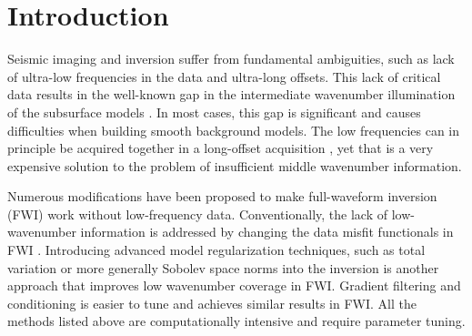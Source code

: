 \documentclass[paper,twocolomn]{geophysics}
\begin{document}
	






\section{Introduction}
Seismic imaging and inversion suffer from fundamental ambiguities, such as lack of ultra-low frequencies in the data and ultra-long offsets. This lack of critical data results in the well-known gap in the intermediate wavenumber illumination of the subsurface models \citep{claerbout1985, mora1989, sirgue2004, alkhalifahFullmodelWavenumberInversion2016, kazei2016, kazei2018, yao2019extraction}. In most cases, this gap is significant and causes difficulties when building smooth background models. The low frequencies can in principle be acquired together in a long-offset acquisition \citep[e.g.][]{fons2013}, yet that is a very expensive solution to the problem of insufficient middle wavenumber information.


Numerous modifications have been proposed to make full-waveform inversion (FWI) work without low-frequency data. %
Conventionally, the lack of low-wavenumber information is addressed by changing the data misfit functionals in FWI \citep[e.g.][]{luo1991wave, bozdag2011, choi2012, leeuwen2013, sun2019robust}.
Introducing advanced model regularization techniques, such as total variation or more generally Sobolev space norms \citep[e.g.][]{esserTotalvariationRegularizationStrategies2016, kazeiSaltbodyInversionMinimum2017, kalita2019regularized, skopintseva2019regularization} into the inversion is another approach that improves low wavenumber coverage in FWI.
Gradient filtering and conditioning \citep{ravaut2004multiscale, alkhalifahFullmodelWavenumberInversion2016, kazei2016, ovcharenko2018, ruan2018global} is easier to tune and achieves similar results in FWI. All the methods listed above are computationally intensive and require parameter tuning.
\end{document}
